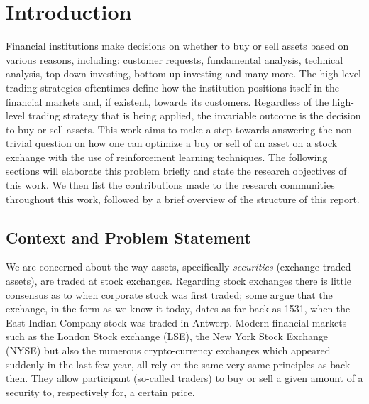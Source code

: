 \chapter{Introduction}

Financial institutions make decisions on whether to buy or sell assets based on various reasons, including: customer requests, fundamental analysis\cite{fundamental-analysis}, technical analysis\cite{technical-analysis}, top-down investing\cite{td-investing}, bottom-up investing\cite{bu-investing} and many more. 
The high-level trading strategies oftentimes define how the institution positions itself in the financial markets and, if existent, towards its customers. 
Regardless of the high-level trading strategy that is being applied, the invariable outcome is the decision to buy or sell assets.
This work aims to make a step towards answering the non-trivial question on how one can optimize a buy or sell of an asset on a stock exchange with the use of reinforcement learning techniques.
The following sections will elaborate this problem briefly and state the research objectives of this work. 
We then list the contributions made to the research communities throughout this work, followed by a brief overview of the structure of this report.

\section{Context and Problem Statement}
\label{sec:problem-statement}

We are concerned about the way assets, specifically \textit{securities} (exchange traded assets), are traded at stock exchanges.
Regarding stock exchanges there is little consensus as to when corporate stock was first traded; some argue that the exchange, in the form as we know it today, dates as far back as 1531, when the East Indian Company stock was traded in Antwerp\cite{stock-exchange}.
Modern financial markets such as the London Stock exchange (LSE), the New York Stock Exchange (NYSE) but also the numerous crypto-currency exchanges which appeared suddenly in the last few year, all rely on the same very same principles as back then.
They allow participant (so-called traders) to buy or sell a given amount of a security to, respectively for, a certain price.

